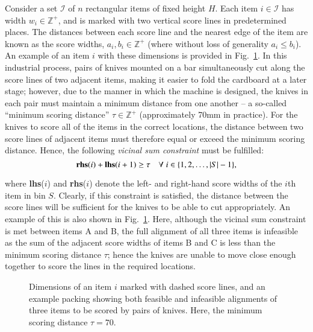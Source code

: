 \documentclass[a4paper,11pt,authoryear]{elsarticle}
\begin{document}
Consider a set $\mathcal{I}$ of $n$ rectangular items of fixed height $H$. Each item $i \in \mathcal{I}$ has width $w_i \in \mathbb{Z}^+$, and is marked with two vertical score lines in predetermined places. The distances between each score line and the nearest edge of the item are known as the score widths, $a_i, b_i \in \mathbb{Z}^+$ (where without loss of generality $a_i \leq b_i$). An example of an item $i$ with these dimensions is provided in Fig.~\ref{fig:itemsdimknives}. In this industrial process, pairs of knives mounted on a bar simultaneously cut along the score lines of two adjacent items, making it easier to fold the cardboard at a later stage; however, due to the manner in which the machine is designed, the knives in each pair must maintain a minimum distance from one another -- a so-called ``minimum scoring distance'' $\tau \in \mathbb{Z}^+$ (approximately 70mm in practice). For the knives to score all of the items in the correct locations, the distance between two score lines of adjacent items must therefore equal or exceed the minimum scoring distance. Hence, the following \emph{vicinal sum constraint} must be fulfilled:
\begin{equation}
	\textbf{rhs}(i) + \textbf{lhs}(i+1) \geq \tau \quad \forall \hspace{1mm} i \in \{1,2,\dotsc,|S|- 1\},
	\label{eqn:vsc}
\end{equation}

\noindent where \textbf{lhs}($i$) and \textbf{rhs}($i$) denote the left- and right-hand score widths of the $i$th item in bin $S$. Clearly, if this constraint is satisfied, the distance between the score lines will be sufficient for the knives to be able to cut appropriately. An example of this is also shown in Fig.~\ref{fig:itemsdimknives}. Here, although the vicinal sum constraint is met between items A and B, the full alignment of all three items is infeasible as the sum of the adjacent score widths of items B and C is less than the minimum scoring distance $\tau$; hence the knives are unable to move close enough together to score the lines in the required locations.

\begin{figure}[H]	
	\centering
	
	\caption{Dimensions of an item $i$ marked with dashed score lines, and an example packing showing both feasible and infeasible alignments of three items to be scored by pairs of knives. Here, the minimum scoring distance $\tau = 70$.}	
	\label{fig:itemsdimknives}
\end{figure}
\end{document}
